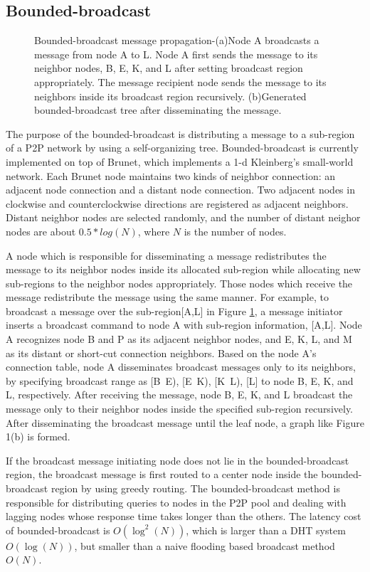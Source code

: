 \documentclass{acm_proc_article-sp}
\begin{document}
\subsection{Bounded-broadcast}
\begin{figure}[t]

\centering
{}
\caption{Bounded-broadcast message propagation-(a)Node A broadcasts a message from node A to L. Node A first sends the message to its neighbor nodes, B, E, K, and L after setting broadcast region appropriately.
The message recipient node sends the message to its neighbors inside its broadcast region recursively. (b)Generated bounded-broadcast tree after disseminating the message.
\label{figure:bb}
}
\end{figure}
The purpose of the bounded-broadcast\cite{deetoo} is distributing a message to a sub-region of a P2P network by using a self-organizing tree.
Bounded-broadcast is currently implemented on top of Brunet\cite{brunet}, which implements a 1-d Kleinberg's small-world network\cite{small_world_network}.
Each Brunet node maintains two kinds of neighbor connection: an adjacent node connection and a distant node connection.
Two adjacent nodes in clockwise and counterclockwise directions are registered as adjacent neighbors.
Distant neighbor nodes are selected randomly, and the number of distant neighor nodes are about $0.5*log(N)$, where $N$ is the number of nodes.

A node which is responsible for disseminating a message redistributes the message to its neighbor nodes inside its allocated sub-region while allocating new sub-regions to the neighbor nodes appropriately.
Those nodes which receive the message redistribute the message using the same manner.
For example, to broadcast a message over the sub-region[A,L] in Figure \ref{figure:bb}, a message initiator inserts a broadcast command to node A with sub-region information, [A,L]. 
Node A recognizes node B and P as its adjacent neighbor nodes, and  E, K, L, and M as its distant or short-cut connection neighbors.
Based on the node A's connection table, node A disseminates broadcast messages only to its neighbors, by specifying broadcast range as [B~E), [E~K), [K~L), [L] to node B, E, K, and L, respectively.
After receiving the message, node B, E, K, and L broadcast the message only to their neighbor nodes inside the specified sub-region recursively. 
After disseminating the broadcast message until the leaf node, a graph like Figure 1(b) is formed.

If the broadcast message initiating node does not lie in the bounded-broadcast region, the broadcast message is first routed to a center node inside the bounded-broadcast region by using greedy routing.
The bounded-broadcast method is responsible for distributing queries to nodes in the P2P pool and dealing with lagging nodes whose response time takes longer than the others. 
The latency cost of bounded-broadcast is  $O(\log^2(N))$\cite{deetoo}, which is larger than a DHT system $O(\log(N))$\cite{chord}, but smaller than a naive flooding based broadcast method $O(N)$.
\end{document}
